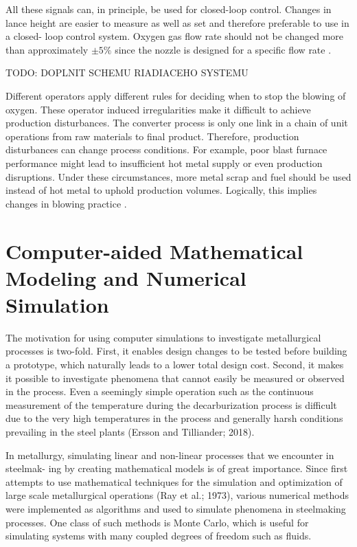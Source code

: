 All these signals can, in principle, be used for closed-loop control. Changes in lance height are easier to measure as well as set and therefore preferable to use in a closed- loop control system. Oxygen gas flow rate should not be changed more than approximately $\pm5\%$ since the nozzle is designed for a specific flow rate \citep{Widlund1998}.

TODO: DOPLNIT SCHEMU RIADIACEHO SYSTEMU

Different operators apply different rules for deciding when to stop the blowing of oxygen. These operator induced irregularities make it difficult to achieve production disturbances. The converter process is only one link in a chain of unit operations from raw materials to final product. Therefore, production disturbances can change process conditions. For example, poor blast furnace performance might lead to insufficient hot metal supply or even production disruptions. Under these circumstances, more metal scrap and fuel should be used instead of hot metal to uphold production volumes. Logically, this implies changes in blowing practice \citep{Widlund1998}.

\section{Computer-aided Mathematical Modeling and Numerical Simulation}

The motivation for using computer simulations to investigate metallurgical processes is two-fold. First, it enables design changes to be tested before building a prototype, which naturally leads to a lower total design cost. Second, it makes it possible to investigate phenomena that cannot easily be measured or observed in the process. Even a seemingly simple operation such as the continuous measurement of the temperature during the decarburization process is difficult due to the very high temperatures in the process and generally harsh conditions prevailing in the steel plants (Ersson and Tilliander; 2018).

In metallurgy, simulating linear and non-linear processes that we encounter in steelmak- ing by creating mathematical models is of great importance. Since first attempts to use mathematical techniques for the simulation and optimization of large scale metallurgical operations (Ray et al.; 1973), various numerical methods were implemented as algorithms and used to simulate phenomena in steelmaking processes. One class of such methods is Monte Carlo, which is useful for simulating systems with many coupled degrees of freedom such as fluids.

